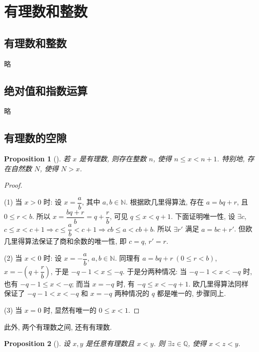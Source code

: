 \documentclass[UTF8]{ctexart}
\theoremstyle{mystyle}
\newtheorem{proposition}{Proposition}[section]
\theoremstyle{myremark}
\theoremstyle{plain}
\newcommand{\N}{\mathbb N}
\newcommand{\Q}{\mathbb Q}
\begin{document}
\section{有理数和整数}
\subsection{有理数和整数}
略

\subsection{绝对值和指数运算}
略

\subsection{有理数的空隙}
\begin{proposition}[]
    若 $ x $ 是有理数, 则存在整数 $ n $, 使得 $ n \leqslant x < n + 1 $. 特别地, 存在自然数 $ N $, 使得 $ N > x $.
\end{proposition}


\begin{proof}
    \begin{doublespace}
        (1) 当 $ x > 0 $ 时: 设 $ x = \dfrac{a}{b} $, 其中 $ a, b \in \N $. 根据欧几里得算法, 存在 $ a = b q + r $, 且 $ 0 \leqslant r < b $. 所以 $ x = \dfrac{b q + r}{b} = q + \dfrac{r}{b} $, 可见 $ q \leqslant x < q + 1 $. 下面证明唯一性, 设 $ \exists c $, $ c \leqslant x < c + 1 \Longrightarrow c \leqslant \dfrac{a}{b} < c + 1 \Longrightarrow cb \leqslant a < cb + b $. 所以 $ \exists r' $ 满足 $ a = b c + r' $. 但欧几里得算法保证了商和余数的唯一性, 即 $ c = q $, $ r' = r $.
    
        
        (2) 当 $ x < 0 $ 时: 设 $ x = -\dfrac{a}{b} $, $ a, b \in \N $. 同理有 $ a = b q + r \ (0 \leqslant r < b) $, $ x = -\left( q + \dfrac{r}{b} \right) $, 于是 $ -q - 1 < x \leqslant - q $. 于是分两种情况: 当 $ -q - 1 < x < - q $ 时, 也有 $ -q - 1 \leqslant x < -q $; 而当 $ x = -q $ 时, 有 $ -q \leqslant x < - q + 1 $. 欧几里得算法同样保证了 $ -q - 1 < x < -q $ 和 $ x = -q $ 两种情况的 $ q $ 都是唯一的, 步骤同上. 
    \end{doublespace}

    (3) 当 $ x = 0 $ 时, 显然有唯一的 $ 0 \leqslant  x < 1 $.
\end{proof}


此外, 两个有理数之间, 还有有理数. 
\begin{proposition}[]
    设 $ x, y $ 是任意有理数且 $ x < y $. 则 $ \exists z \in \Q $, 使得 $ x < z < y $.
\end{proposition}
\end{document}
